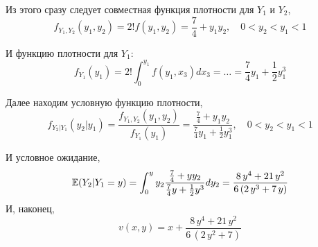 \begin{enumerate}
\begin{enumerate}
Из этого сразу следует совместная функция плотности для $ Y_{1} $ и $ Y_{2} $,
\begin{equation}
f_{Y_{1},Y_{2}}(y_{1},y_{2})=2! f(y_{1},y_{2})=\frac{7}{4}+y_{1}y_{2}, \quad 0<y_{2}<y_{1}<1
\end{equation}

И функцию плотности для $ Y_{1} $:
\begin{equation}
f_{Y_{1}}(y_{1})=2!\int_{0}^{y_{1}} f(y_{1},x_{3}) dx_{3}=\ldots=\frac{7}{4}y_{1}+\frac{1}{2}y_{1}^{3}
\end{equation}

Далее находим условную функцию плотности,
\begin{equation}
 f_{Y_{2}|Y_{1}}(y_{2}|y_{1})=\frac{f_{Y_{1},Y_{2}}(y_{1},y_{2})}{f_{Y_{1}}(y_{1})}=\frac{\frac{7}{4}+y_{1}y_{2}}{\frac{7}{4}y_{1}+\frac{1}{2}y_{1}^{3}}, \quad 0<y_{2}<y_{1}<1
\end{equation}

И условное ожидание,
\begin{equation}
\operatorname{\mathbb{E}}(Y_{2}|Y_{1}=y)=\int_{0}^{y} y_{2} \frac{\frac{7}{4}+yy_{2}}{\frac{7}{4}y+\frac{1}{2}y^{3}}dy_{2}=\frac{8 \, y^{4} + 21 \, y^{2}}{6 \, {\left(2 \, y^{3} + 7 \, y\right)}}
\end{equation}
И, наконец,
\begin{equation}
v(x,y)=x+\frac{8 \, y^{4} + 21 \, y^{2}}{6 \, {\left(2 \, y^{2} + 7\right)}}
\end{equation}

\end{enumerate}
\end{enumerate}
